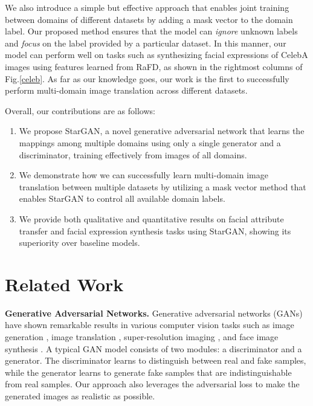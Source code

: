 We also introduce a simple but effective approach that enables joint training between domains of different datasets by adding a mask vector to the domain label. Our proposed method ensures that the model can \textit{ignore} unknown labels and \textit{focus} on the label provided by a particular dataset. In this manner, our model can perform well on tasks such as synthesizing facial expressions of CelebA images using features learned from RaFD, as shown in the rightmost columns of Fig.\thinspace\ref{celeb}. As far as our knowledge goes, our work is the first to successfully perform multi-domain image translation across different datasets.

Overall, our contributions are as follows:

\begin{enumerate}
\item[$\bullet$] We propose StarGAN, a novel generative adversarial network that learns the mappings among multiple domains using only a single generator and a discriminator, training effectively from images of all domains.

\item[$\bullet$] We demonstrate how we can successfully learn multi-domain image translation between multiple datasets by utilizing a mask vector method that enables StarGAN to control all available domain labels.

\item[$\bullet$] We provide both qualitative and quantitative results on facial attribute transfer and facial expression synthesis tasks using StarGAN, showing its superiority over baseline models.

\end{enumerate}

\section{Related Work} \label{related work}

\textbf{Generative Adversarial Networks.} Generative adversarial networks (GANs) \cite{goodfellow2014generative} have shown remarkable results in various computer vision tasks such as image generation \cite{Huang_2017_CVPR,radford2015unsupervised,zhao2016energy,karras2017progressive}, image translation \cite{Isola_2017_CVPR,kim2017learning,zhu2017unpaired}, super-resolution imaging \cite{Ledig_2017_CVPR}, and face image synthesis \cite{kim2017unsupervised,li2016deep,Shen_2017_CVPR,Zhang_2017_CVPR}. A typical GAN model consists of two modules: a discriminator and a generator. The discriminator learns to distinguish between real and fake samples, while the generator learns to generate fake samples that are indistinguishable from real samples. Our approach also leverages the adversarial loss to make the generated images as realistic as possible.

